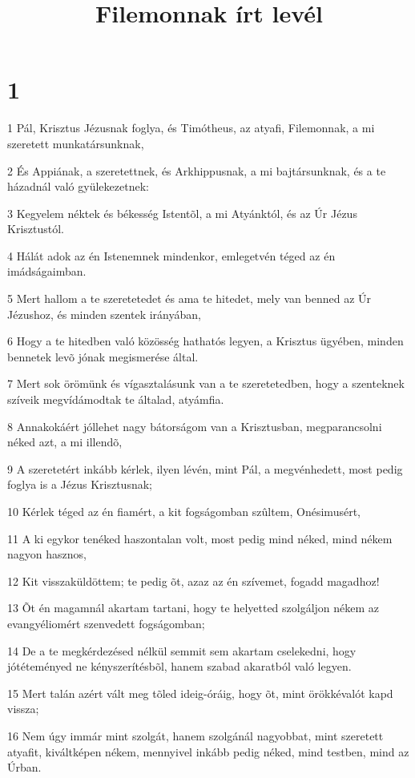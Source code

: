 

\title{Filemonnak írt levél}


\chapter{1}

\par 1 Pál, Krisztus Jézusnak foglya, és Timótheus, az atyafi, Filemonnak, a mi szeretett munkatársunknak,
\par 2 És Appiának, a szeretettnek, és Arkhippusnak, a mi bajtársunknak, és a te házadnál való gyülekezetnek:
\par 3 Kegyelem néktek és békesség Istentõl, a mi Atyánktól, és az Úr Jézus Krisztustól.
\par 4 Hálát adok az én Istenemnek mindenkor, emlegetvén téged az én imádságaimban.
\par 5 Mert hallom a te szeretetedet és ama te hitedet, mely van benned az Úr Jézushoz, és minden szentek irányában,
\par 6 Hogy a te hitedben való közösség hathatós legyen, a Krisztus ügyében, minden bennetek levõ jónak megismerése által.
\par 7 Mert sok örömünk és vígasztalásunk van a te szeretetedben, hogy a szenteknek szíveik megvídámodtak te általad, atyámfia.
\par 8 Annakokáért jóllehet nagy bátorságom van a Krisztusban, megparancsolni néked azt, a mi illendõ,
\par 9 A szeretetért inkább kérlek, ilyen lévén, mint Pál, a megvénhedett, most pedig foglya is a Jézus Krisztusnak;
\par 10 Kérlek téged az én fiamért, a kit fogságomban szûltem, Onésimusért,
\par 11 A ki egykor tenéked haszontalan volt, most pedig mind néked, mind nékem nagyon hasznos,
\par 12 Kit visszaküldöttem; te pedig õt, azaz az én szívemet, fogadd magadhoz!
\par 13 Õt én magamnál akartam tartani, hogy te helyetted szolgáljon nékem az evangyéliomért szenvedett fogságomban;
\par 14 De a te megkérdezésed nélkül semmit sem akartam cselekedni, hogy jótéteményed ne kényszerítésbõl, hanem szabad akaratból való legyen.
\par 15 Mert talán azért vált meg tõled ideig-óráig, hogy õt, mint örökkévalót kapd vissza;
\par 16 Nem úgy immár mint szolgát, hanem szolgánál nagyobbat, mint szeretett atyafit, kiváltképen nékem, mennyivel inkább pedig néked, mind testben, mind az Úrban.
